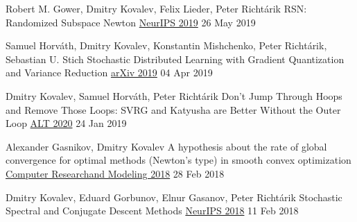 \begin{cventries}
\cventry
{Robert M. Gower, Dmitry Kovalev, Felix Lieder, Peter Richtárik} %
{RSN: Randomized Subspace Newton} %
{\href{https://papers.nips.cc/paper/8351-rsn-randomized-subspace-newton}{NeurIPS 2019}} 
{26 May 2019} %
{}	


\cventry
{Samuel Horváth, Dmitry Kovalev, Konstantin Mishchenko, Peter Richtárik, Sebastian U. Stich} %
{Stochastic Distributed Learning with Gradient Quantization and Variance Reduction} %
{\href{https://arxiv.org/abs/1904.05115}{arXiv 2019}} 
{04 Apr 2019} %
{}	

\cventry
{Dmitry Kovalev, Samuel Horváth, Peter Richtárik} %
{Don't Jump Through Hoops and Remove Those Loops: SVRG and Katyusha are Better Without the Outer Loop} %
{\href{http://proceedings.mlr.press/v117/kovalev20a}{ALT 2020}} 
{24 Jan 2019} %
{}	

\cventry
{Alexander Gasnikov, Dmitry Kovalev} %
{A hypothesis about the rate of global convergence for optimal methods (Newton's type) in smooth convex optimization} %
{\href{http://www.mathnet.ru/php/archive.phtml?wshow=paper\&jrnid=crm\&paperid=253\&option\_lang=eng}{
						Computer Research\linebreak and Modeling  2018}} 
{28 Feb 2018} %
{}	

\cventry
{Dmitry Kovalev, Eduard Gorbunov, Elnur Gasanov, Peter Richtárik} %
{Stochastic Spectral and Conjugate Descent Methods} %
{\href{https://papers.nips.cc/paper/7596-stochastic-spectral-and-conjugate-descent-methods}{NeurIPS 2018}} 
{11 Feb 2018} %
{}	


\end{cventries}
